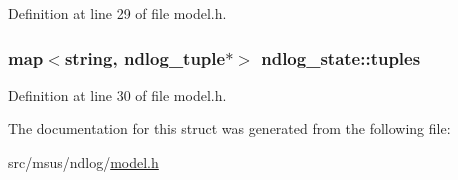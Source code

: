 Definition at line 29 of file model.\-h.

\hypertarget{structndlog__state_a30e8b1c430795b117da273e238766e54}{
\subsubsection[{tuples}]{\setlength{\rightskip}{0pt plus 5cm}map$<$string, {\bf ndlog\-\_\-tuple}$\ast$$>$ ndlog\-\_\-state\-::tuples}}\label{structndlog__state_a30e8b1c430795b117da273e238766e54}


Definition at line 30 of file model.\-h.



The documentation for this struct was generated from the following file\-:\begin{DoxyCompactItemize}
\item 
src/msus/ndlog/\hyperlink{model_8h}{model.\-h}\end{DoxyCompactItemize}
